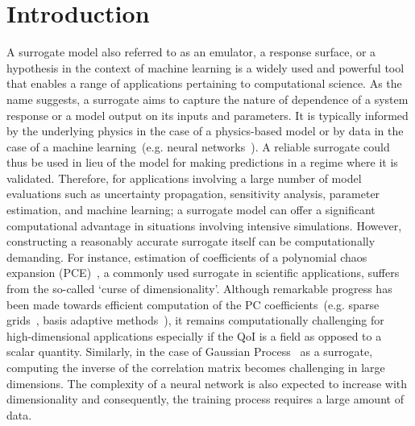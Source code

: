\section{Introduction}
\label{sec:intro}


A surrogate model also referred to as an emulator, a response surface, or a hypothesis in the context of machine
learning is a widely used and powerful tool that enables a range of applications pertaining to 
computational science. As the name suggests, a surrogate aims to capture the nature of dependence of a system
response or a model output on its inputs and parameters. It is typically informed by the underlying physics in the 
case of a physics-based model or by data in the case of a machine learning~(e.g. neural networks~\cite{Hagan:1996}).
A reliable surrogate could thus
be used in lieu of the model for making predictions in a regime where it is validated. Therefore, for applications
involving a large number of model evaluations such as uncertainty propagation, sensitivity analysis, parameter
estimation, and machine learning; a surrogate model can offer a significant computational advantage in situations involving 
intensive simulations. However, constructing a reasonably accurate surrogate itself can be computationally demanding.
For instance, estimation of coefficients of a polynomial chaos expansion (PCE)~\cite{Xiu:2002,Ghanem:1991},
a commonly used surrogate
in scientific applications, suffers from the so-called `curse of dimensionality'. Although remarkable progress has been 
made towards efficient computation of the PC coefficients~(e.g. sparse 
grids~\cite{Gerstner:1998,Ganapathysubramanian:2007}, basis adaptive 
methods~\cite{Blatman:2011,Conrad:2013,Winokur:2013}), it remains computationally challenging for high-dimensional 
applications especially if the QoI is a field as opposed to a scalar quantity. Similarly, in the case of Gaussian 
Process~\cite{Rasmussen:2004} as
a surrogate, computing the inverse of the correlation matrix becomes challenging in large dimensions. The complexity of
a neural network is also expected to increase with dimensionality and consequently, the training process requires a large
amount of data. 


